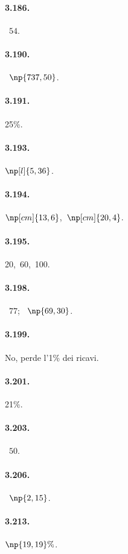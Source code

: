 \begin{multicols}{3}
\paragraph{3.186.} \officialeuro~$54$.

\paragraph{3.190.} \officialeuro~$\np{737,50}$.

\paragraph{3.191.} 25\%.

\paragraph{3.193.} $\np[l]{5,36}$.

\paragraph{3.194.} $\np[cm]{13,6}$,~$\np[cm]{20,4}$.

\paragraph{3.195.} 20{\textdegree},~60{\textdegree},~100{\textdegree}.

\paragraph{3.198.} \officialeuro~$77$; \officialeuro~$\np{69,30}$.

\paragraph{3.199.} No, perde l'1\% dei ricavi.

\paragraph{3.201.} 21\%.

\paragraph{3.203.} \officialeuro~$50$.

\paragraph{3.206.} \officialeuro~$\np{2,15}$.

\paragraph{3.213.} $\np{19,19}\%$.

\end{multicols}

